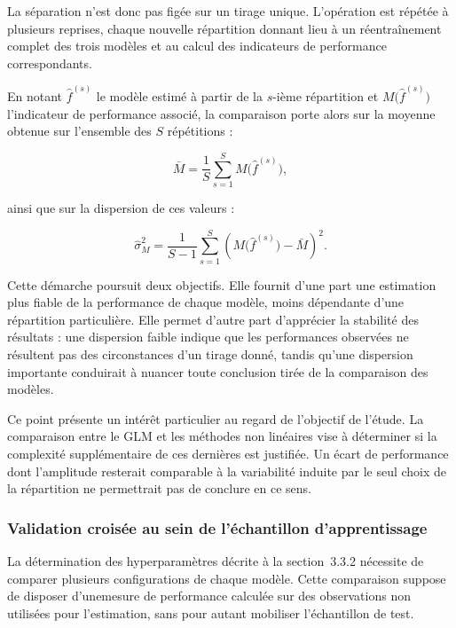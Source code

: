 La séparation n'est donc pas figée sur un tirage unique. L'opération est répétée à plusieurs reprises, chaque nouvelle répartition donnant lieu à un réentraînement complet des trois modèles et au calcul des indicateurs de performance correspondants.

En notant $\hat{f}^{(s)}$ le modèle estimé à partir de la $s$-ième répartition et $M\big(\hat{f}^{(s)}\big)$ l'indicateur de performance associé, la comparaison porte alors sur la moyenne obtenue sur l'ensemble des $S$ répétitions :

\begin{equation}
\bar{M} = \frac{1}{S} \sum_{s=1}^{S} M\big(\hat{f}^{(s)}\big),
\label{eq:moyenne-repetitions}
\end{equation}

ainsi que sur la dispersion de ces valeurs :

\begin{equation}
\hat{\sigma}_M^2 = \frac{1}{S-1} \sum_{s=1}^{S} 
\left( M\big(\hat{f}^{(s)}\big) - \bar{M} \right)^2.
\label{eq:dispersion-repetitions}
\end{equation}

Cette démarche poursuit deux objectifs. Elle fournit d'une part une estimation plus fiable de la performance de chaque modèle, moins dépendante d'une répartition particulière. Elle permet d'autre part d'apprécier la stabilité des résultats : une dispersion faible indique que les performances observées ne résultent pas des circonstances d'un tirage donné, tandis qu'une dispersion importante conduirait à nuancer toute conclusion tirée de la comparaison des modèles.

Ce point présente un intérêt particulier au regard de l'objectif de l'étude. La comparaison entre le GLM et les méthodes non linéaires vise à déterminer si la complexité supplémentaire de ces dernières est justifiée. Un écart de performance dont l'amplitude resterait comparable à la variabilité induite par le seul choix de la répartition ne permettrait pas de conclure en ce sens.

\subsubsection{Validation croisée au sein de l'échantillon d'apprentissage}

La détermination des hyperparamètres décrite à la section~3.3.2 nécessite de comparer plusieurs configurations de chaque modèle. Cette comparaison suppose de disposer d'unemesure de performance calculée sur des observations non utilisées pour l'estimation, sans pour autant mobiliser l'échantillon de test.

